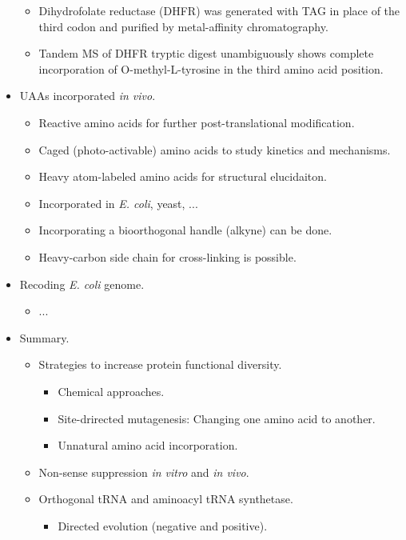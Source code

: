 \documentclass[../notes.tex]{subfiles}
\begin{document}
\begin{itemize}
    \begin{itemize}
        \item Dihydrofolate reductase (DHFR) was generated with TAG in place of the third codon and purified by metal-affinity chromatography.
        \item Tandem MS of DHFR tryptic digest unambiguously shows complete incorporation of O-methyl-L-tyrosine in the third amino acid position.
    \end{itemize}
    \item UAAs incorporated \emph{in vivo}.
    \begin{itemize}
        \item Reactive amino acids for further post-translational modification.
        \item Caged (photo-activable) amino acids to study kinetics and mechanisms.
        \item Heavy atom-labeled amino acids for structural elucidaiton.
        \item Incorporated in \emph{E. coli}, yeast, ...
        \item Incorporating a bioorthogonal handle (alkyne) can be done.
        \item Heavy-carbon side chain for cross-linking is possible.
    \end{itemize}
    \item Recoding \emph{E. coli} genome.
    \begin{itemize}
        \item ...
    \end{itemize}
    \item Summary.
    \begin{itemize}
        \item Strategies to increase protein functional diversity.
        \begin{itemize}
            \item Chemical approaches.
            \item Site-drirected mutagenesis: Changing one amino acid to another.
            \item Unnatural amino acid incorporation. 
        \end{itemize}
        \item Non-sense suppression \emph{in vitro} and \emph{in vivo}.
        \item Orthogonal tRNA and aminoacyl tRNA synthetase.
        \begin{itemize}
            \item Directed evolution (negative and positive).

\end{itemize}
\end{itemize}
\end{itemize}
\end{document}
